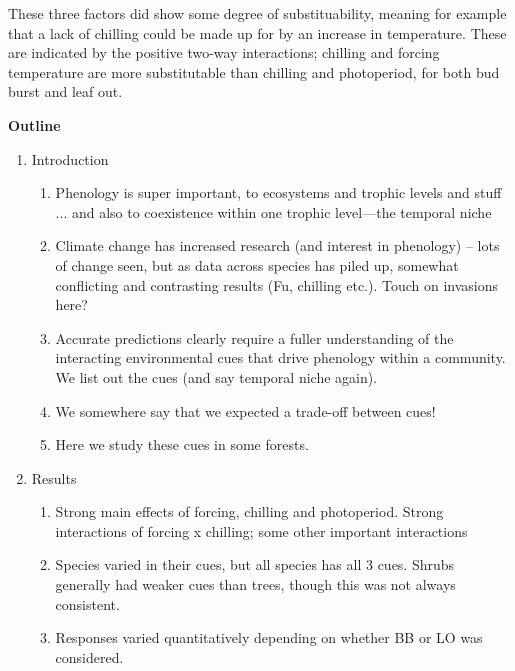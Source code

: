 \documentclass[11pt,a4paper]{article}
\begin{document}
These three factors did show some degree of substituability, meaning for example that a lack of chilling could be made up for by an increase in temperature. These are indicated by the positive two-way interactions; chilling and forcing temperature are more substitutable than chilling and photoperiod, for both bud burst and leaf out.

{\bf Outline}
\begin{enumerate}

\item Introduction
\begin{enumerate}
\item Phenology is super important, to ecosystems and trophic levels and stuff ... and also to coexistence within one trophic level---the temporal niche
\item Climate change has increased research (and interest in phenology) -- lots of change seen, but as data across species has piled up, somewhat conflicting and contrasting results (Fu, chilling etc.). Touch on invasions here? 
\item Accurate predictions clearly require a fuller understanding of the interacting environmental cues that drive phenology within a community. We list out the cues (and say temporal niche again).
\item We somewhere say that we expected a trade-off between cues!
\item Here we study these cues in some forests.
\end{enumerate}

\item Results 
\begin{enumerate}
\item Strong main effects of forcing, chilling and photoperiod. Strong interactions of forcing x chilling; some other important interactions
\item Species varied in their cues, but all species has all 3 cues. Shrubs generally had weaker cues than trees, though this was not always consistent.
\item Responses varied quantitatively depending on whether BB or LO was considered.
\end{enumerate}


\end{enumerate}
\end{document}

